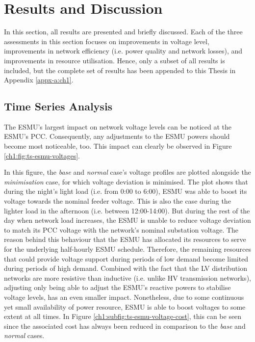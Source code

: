 \section{Results and Discussion}
\label{ch1:sec:results-and-discussion}

In this section, all results are presented and briefly discussed.
Each of the three assessments in this section focuses on improvements in voltage level, improvements in network efficiency (i.e. power quality and network losses), and improvements in resource utilisation.
Hence, only a subset of all results is included, but the complete set of results has been appended to this Thesis in Appendix \ref{appx-a:ch1}.

\subsection{Time Series Analysis}
\label{ch1:subsec:time-series-analysis}

The ESMU's largest impact on network voltage levels can be noticed at the ESMU's PCC.
Consequently, any adjustments to the ESMU powers should become most noticeable, too.
This impact can clearly be observed in Figure \ref{ch1:fig:ts-esmu-voltages}.



In this figure, the \textit{base} and \textit{normal} case's voltage profiles are plotted alongside the \textit{minimisation} case, for which voltage deviation is minimised.
The plot shows that during the night's light load (i.e. from 0:00 to 6:00), ESMU was able to boost its voltage towards the nominal feeder voltage.
This is also the case during the lighter load in the afternoon (i.e. between 12:00-14:00).
But during the rest of the day when network load increases, the ESMU is unable to reduce voltage deviation to match its PCC voltage with the network's nominal substation voltage.
The reason behind this behaviour that the ESMU has allocated its resources to serve for the underlying half-hourly ESMU schedule.
Therefore, the remaining resources that could provide voltage support during periods of low demand become limited during periods of high demand.
Combined with the fact that the LV distribution networks are more resistive than inductive (i.e. unlike HV transmission networks), adjusting only being able to adjust the ESMU's reactive powers to stabilise voltage levels, has an even smaller impact.
Nonetheless, due to some continuous yet small availability of power resource, ESMU is able to boost voltages to some extent at all times. In Figure \ref{ch1:subfig:ts-esmu-voltage-cost}, this can be seen since the associated cost has always been reduced in comparison to the \textit{base} and \textit{normal} cases.

